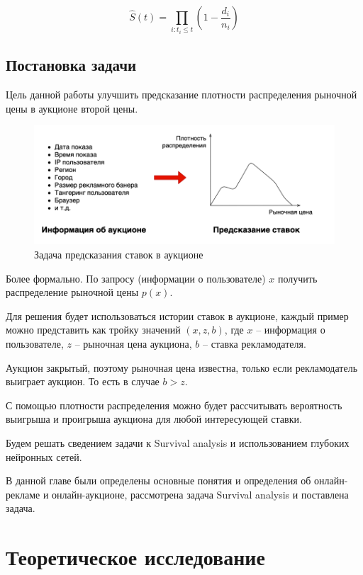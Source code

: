 \documentclass[times,specification,annotation]{itmo-student-thesis}
\begin{document}
\begin{equation}\label{eq:rm}
    \hat{S}(t) = \prod_{i: t_i \leq t} (1 - \frac{d_i}{n_i})
\end{equation}

\section{Постановка задачи}

Цель данной работы улучшить предсказание плотности распределения рыночной цены в аукционе второй цены.

\begin{figure}[h]\label{fig:problem}
    \caption{Задача предсказания ставок в аукционе}
    \centering
    \includegraphics{problem.png}
\end{figure}

Более формально. По запросу (информации о пользователе) $x$ получить распределение рыночной цены $p(x)$.

Для решения будет использоваться истории ставок в аукционе, 
каждый пример можно представить как тройку значений $(x, z, b)$, 
где $x$ – информация о пользователе, 
$z$ – рыночная цена аукциона, 
$b$ – ставка рекламодателя.

Аукцион закрытый, поэтому рыночная цена известна, только если рекламодатель выиграет аукцион. То есть в случае $b > z$.

С помощью плотности распределения можно будет рассчитывать вероятность выигрыша и проигрыша аукциона для любой интересующей ставки.

Будем решать сведением задачи к Survival analysis и использованием глубоких нейронных сетей.

\chapterconclusion

В данной главе были определены основные понятия и определения об онлайн-рекламе и онлайн-аукционе, 
рассмотрена задача Survival analysis и поставлена задача.


\chapter{Теоретическое исследование}
\end{document}
